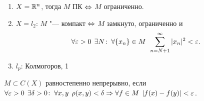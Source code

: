 \documentclass[main]{subfiles}
\begin{document}
\begin{example}
  \begin{enumerate}
    \item \( X = \mathbb{R}^n \), тогда \( M \) ПК \( \Leftrightarrow \) \( M \) ограниченно.
    \item \( X = l_2 \): \( M \) "--- компакт \( \Leftrightarrow \)
      \( M \) замкнуто, ограниченно и
      \[ \forall {\varepsilon> 0} \; \, \exists N \colon \: \forall { \{ x_n \} \in M } \; \,
      \sum_{n = N + 1}^{\infty} |x_n|^2 < \varepsilon. \]
    \item \( l_p \): Колмогоров, 1
  \end{enumerate}
\end{example}

\begin{definition}
  \( M \subset C(X) \) равностепенно непрерывно, если
  \( \forall {\varepsilon> 0} \; \, \exists \delta > 0 \colon \:
  \forall {x, y} \; \, \rho(x, y) < \delta \Rightarrow \forall {f \in M} \; \,
  |f(x) - f(y)| < \varepsilon \).
\end{definition}
\end{document}
